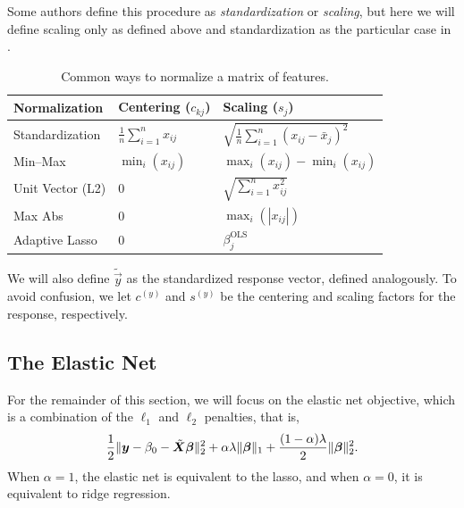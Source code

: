 Some authors define this procedure as \emph{standardization} or \emph{scaling}, but here we will define scaling only as defined above and standardization as the particular case in .

\begin{table}[hbt]
  \centering
  \caption{Common ways to normalize a matrix of features.}
  \label{tab:normalization-types}
  \begin{tabular}{lll}
    \toprule
    Normalization    & Centering (\(c_{kj}\))             & Scaling (\(s_j\))                                         \\
    \midrule
    Standardization  & \(\frac{1}{n}\sum_{i=1}^n x_{ij}\) & \(\sqrt{\frac{1}{n}\sum_{i=1}^n (x_{ij} - \bar{x}_j)^2}\) \\
    \addlinespace
    Min--Max         & \(\min_i(x_{ij})\)                 & \(\max_i(x_{ij}) - \min_i(x_{ij})\)                       \\
    \addlinespace
    Unit Vector (L2) & 0                                  & \(\sqrt{\sum_{i=1}^n x_{ij}^2}\)                          \\
    \addlinespace
    Max Abs          & 0                                  & \(\max_i(|x_{ij}|)\)                                      \\
    \addlinespace
    Adaptive Lasso   & 0                                  & \(\beta_j^\text{OLS}\)                                    \\
    \bottomrule
  \end{tabular}
\end{table}

We will also define \(\tilde{\vec{y}}\) as the standardized response vector, defined analogously. To avoid confusion, we let \(c^{(y)}\) and \(s^{(y)}\) be the centering and scaling factors for the response, respectively.

\subsection{The Elastic Net}

For the remainder of this section, we will focus on the elastic net objective, which is a combination of the \(\ell_1\) and \(\ell_2\) penalties, that is,
\begin{equation}
  \label{eq:elastic-net}
  \frac{1}{2} \lVert \vec y - \beta_0 - \tilde{\mat{X}}\vec{\beta} \rVert^2_2  + \alpha\lambda \lVert \vec\beta \rVert_1 + \frac{(1 - \alpha)\lambda}{2}\lVert \vec \beta \rVert_2^2.
\end{equation}
When \(\alpha = 1\), the elastic net is equivalent to the lasso, and when \(\alpha = 0\), it is equivalent to ridge regression.


